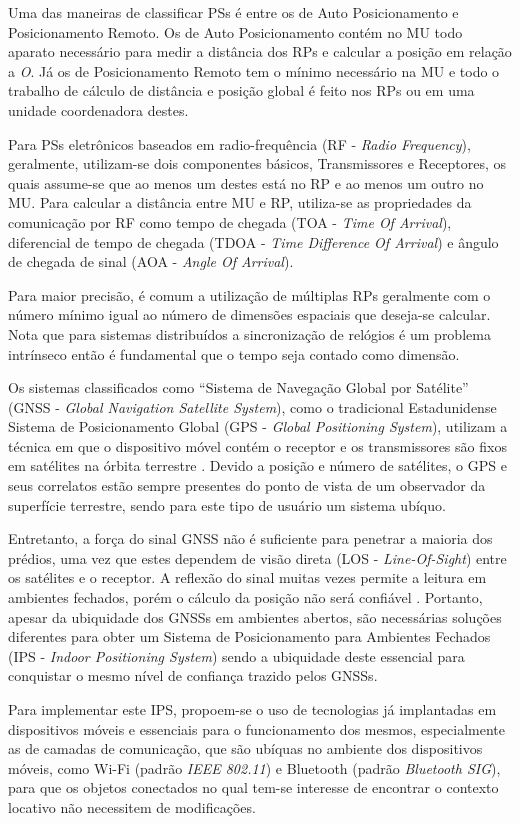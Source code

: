 Uma das maneiras de classificar PSs é entre os de Auto Posicionamento e
Posicionamento Remoto. Os de Auto Posicionamento contém no MU todo aparato
necessário para medir a distância dos RPs e calcular a posição em relação a
\textit{O}. Já os de Posicionamento Remoto tem o mínimo necessário na MU e todo
o trabalho de cálculo de distância e posição global é feito nos RPs ou em uma
unidade coordenadora destes.

Para PSs eletrônicos baseados em radio-frequência (RF - \textit{Radio
Frequency}), geralmente, utilizam-se dois componentes básicos, Transmissores e
Receptores, os quais assume-se que ao menos um destes está no RP e ao menos um
outro no MU. Para calcular a distância entre MU e RP, utiliza-se as propriedades
da comunicação por RF como tempo de chegada (TOA - \textit{Time Of Arrival}),
diferencial de tempo de chegada (TDOA - \textit{Time Difference Of Arrival}) e
ângulo de chegada de sinal (AOA - \textit{Angle Of Arrival}).

Para maior precisão, é comum a utilização de múltiplas RPs geralmente com o
número mínimo igual ao número de dimensões espaciais que deseja-se calcular.
Nota que para sistemas distribuídos a sincronização de relógios é um problema
intrínseco então é fundamental que o tempo seja contado como dimensão.

Os sistemas classificados como ``Sistema de Navegação Global por Satélite''
(GNSS - \textit{Global Navigation Satellite System}), como o tradicional
Estadunidense Sistema de Posicionamento Global (GPS - \textit{Global Positioning
System}), utilizam a técnica em que o dispositivo móvel contém o receptor e os
transmissores são fixos em satélites na órbita terrestre \cite{Djuknic2001}.
Devido a posição e número de satélites, o GPS e seus correlatos estão sempre
presentes do ponto de vista de um observador da superfície terrestre, sendo para
este tipo de usuário um sistema ubíquo.

Entretanto, a força do sinal GNSS não é suficiente para penetrar a maioria dos
prédios, uma vez que estes dependem de visão direta (LOS -
\textit{Line-Of-Sight}) entre os satélites e o receptor. A reflexão do sinal
muitas vezes permite a leitura em ambientes fechados, porém o cálculo da posição
não será confiável \cite{Chen2000}. Portanto, apesar da ubiquidade dos
GNSSs em ambientes abertos, são necessárias soluções diferentes para obter um
Sistema de Posicionamento para Ambientes Fechados (IPS - \textit{Indoor
Positioning System}) sendo a ubiquidade deste essencial para conquistar o mesmo
nível de confiança trazido pelos GNSSs.

Para implementar este IPS, propoem-se o uso de tecnologias já implantadas em
dispositivos móveis e essenciais para o funcionamento dos mesmos, especialmente
as de camadas de comunicação, que são ubíquas no ambiente dos dispositivos
móveis, como Wi-Fi (padrão \textit{IEEE 802.11}) e Bluetooth (padrão
\textit{Bluetooth SIG}), para que os objetos conectados no qual tem-se interesse
de encontrar o contexto locativo não necessitem de modificações.
